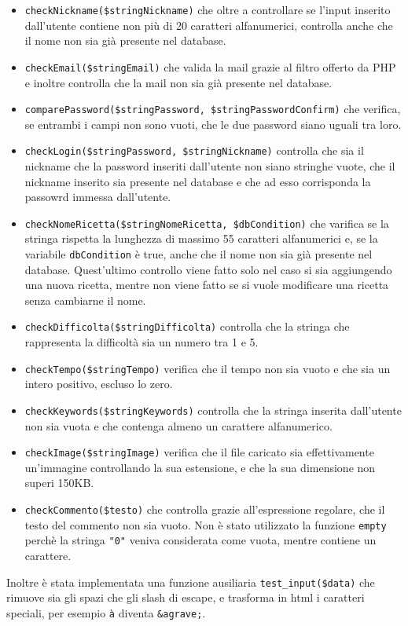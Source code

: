 \begin{itemize}
	\item \texttt{checkNickname(\$stringNickname)} che oltre a controllare se l'input inserito dall'utente contiene non più di 20 caratteri alfanumerici, controlla anche che il nome non sia già presente nel database.
	\item \texttt{checkEmail(\$stringEmail)} che valida la mail grazie al filtro offerto da PHP e inoltre controlla che la mail non sia già presente nel database.
	\item \texttt{comparePassword(\$stringPassword, \$stringPasswordConfirm)} che verifica, se entrambi i campi non sono vuoti, che le due password siano uguali tra loro.
	\item \texttt{checkLogin(\$stringPassword, \$stringNickname)} controlla che sia il nickname che la password inseriti dall'utente non siano stringhe vuote, che il nickname inserito sia presente nel database e che ad esso corrisponda la passowrd immessa dall'utente.
	\item \texttt{checkNomeRicetta(\$stringNomeRicetta, \$dbCondition)} che varifica se la stringa rispetta la lunghezza di massimo 55 caratteri alfanumerici e, se la variabile \texttt{dbCondition} è true, anche che il nome non sia già presente nel database. Quest'ultimo controllo viene fatto solo nel caso si sia aggiungendo una nuova ricetta, mentre non viene fatto se si vuole modificare una ricetta senza cambiarne il nome.
	\item \texttt{checkDifficolta(\$stringDifficolta)} controlla che la stringa che rappresenta la difficoltà sia un numero tra 1 e 5.
	\item \texttt{checkTempo(\$stringTempo)} verifica che il tempo non sia vuoto e che sia un intero positivo, escluso lo zero.
	\item \texttt{checkKeywords(\$stringKeywords)} controlla che la stringa inserita dall'utente non sia vuota e che contenga almeno un carattere alfanumerico.
	\item \texttt{checkImage(\$stringImage)} verifica che il file caricato sia effettivamente un'immagine controllando la sua estensione, e che la sua dimensione non superi 150KB.
	\item \texttt{checkCommento(\$testo)} che controlla grazie all'espressione regolare, che il testo del commento non sia vuoto. Non è stato utilizzato la funzione \texttt{empty} perchè la stringa \texttt{"0"} veniva considerata come vuota, mentre contiene un carattere.
\end{itemize}
Inoltre è stata implementata una funzione ausiliaria \texttt{test\_input(\$data)} che rimuove sia gli spazi che gli slash di escape, e trasforma in html i caratteri speciali, per esempio \texttt{à} diventa \texttt{\&agrave;}.

